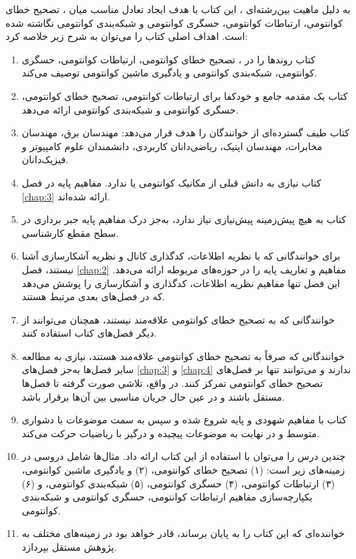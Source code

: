 به دلیل ماهیت بین‌رشته‌ای ، این کتاب با هدف ایجاد تعادل مناسب میان ، تصحیح خطای کوانتومی، ارتباطات کوانتومی، حسگری کوانتومی و شبکه‌بندی کوانتومی نگاشته شده است. اهداف اصلی کتاب را می‌توان به شرح زیر خلاصه کرد:

\begin{enumerate}
	\item کتاب روندها را در ، تصحیح خطای کوانتومی، ارتباطات کوانتومی، حسگری کوانتومی، شبکه‌بندی کوانتومی و یادگیری ماشین کوانتومی توصیف می‌کند.
	\item کتاب یک مقدمه جامع و خودکفا برای ارتباطات کوانتومی، تصحیح خطای کوانتومی، حسگری کوانتومی و شبکه‌بندی کوانتومی ارائه می‌دهد.
	\item کتاب طیف گسترده‌ای از خوانندگان را هدف قرار می‌دهد: مهندسان برق، مهندسان مخابرات، مهندسان اپتیک، ریاضی‌دانان کاربردی، دانشمندان علوم کامپیوتر و فیزیک‌دانان.
	\item کتاب نیازی به دانش قبلی از مکانیک کوانتومی یا  ندارد. مفاهیم پایه در فصل \ref{chap:3} ارائه شده‌اند.
	\item کتاب به هیچ پیش‌زمینه پیش‌نیازی نیاز ندارد، به‌جز درک مفاهیم پایه جبر برداری در سطح مقطع کارشناسی.
	\item برای خوانندگانی که با نظریه اطلاعات، کدگذاری کانال و نظریه آشکارسازی آشنا نیستند، فصل \ref{chap:2} مفاهیم و تعاریف پایه را در حوزه‌های مربوطه ارائه می‌دهد. این فصل تنها مفاهیم نظریه اطلاعات، کدگذاری و آشکارسازی را پوشش می‌دهد که در فصل‌های بعدی مرتبط هستند.
	\item خوانندگانی که به تصحیح خطای کوانتومی علاقه‌مند نیستند، همچنان می‌توانند از دیگر فصل‌های کتاب استفاده کنند.
	\item خوانندگانی که صرفاً به تصحیح خطای کوانتومی علاقه‌مند هستند، نیازی به مطالعه سایر فصل‌ها به‌جز فصل‌های \ref{chap:3} و \ref{chap:4} ندارند و می‌توانند تنها بر فصل‌های تصحیح خطای کوانتومی تمرکز کنند. در واقع، تلاشی صورت گرفته تا فصل‌ها مستقل باشند و در عین حال جریان مناسبی بین آن‌ها برقرار باشد.
	\item کتاب با مفاهیم شهودی و پایه شروع شده و سپس به سمت موضوعات با دشواری متوسط و در نهایت به موضوعات پیچیده و درگیر با ریاضیات حرکت می‌کند.
	\item چندین درس را می‌توان با استفاده از این کتاب ارائه داد. مثال‌ها شامل دروسی در زمینه‌های زیر است: (۱) تصحیح خطای کوانتومی، (۲)  و یادگیری ماشین کوانتومی، (۳) ارتباطات کوانتومی، (۴) حسگری کوانتومی، (۵) شبکه‌بندی کوانتومی، و (۶) یکپارچه‌سازی مفاهیم ارتباطات کوانتومی، حسگری کوانتومی و شبکه‌بندی کوانتومی.
	\item خواننده‌ای که این کتاب را به پایان برساند، قادر خواهد بود در زمینه‌های مختلف  به پژوهش مستقل بپردازد.
\end{enumerate}

